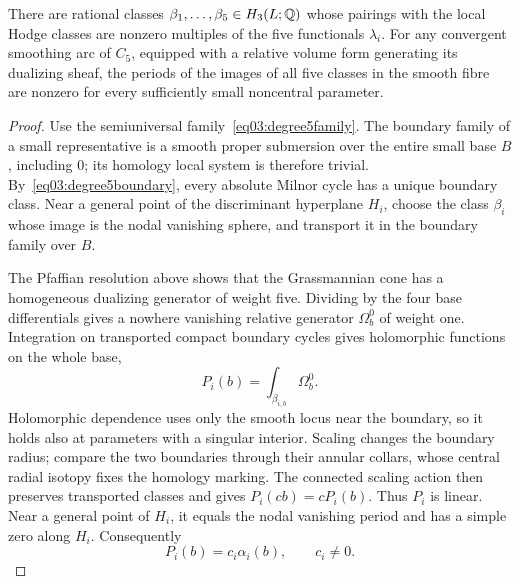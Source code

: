 \begin{lemma}\label{lem03:degree5periods}
There are rational classes $\beta_1,\ldots,\beta_5\in H_3(L;\mathbb{Q})$
whose pairings with the local Hodge classes are nonzero multiples
of the five functionals $\lambda_i$.
For any convergent smoothing arc of $C_5$, equipped with a relative
volume form generating its dualizing sheaf, the periods of the
images of all five classes in the smooth fibre are nonzero for
every sufficiently small noncentral parameter.
\end{lemma}

\begin{proof}
Use the semiuniversal family~\eqref{eq03:degree5family}.
The boundary family of a small representative is a smooth
proper submersion over the entire small base $B$, including $0$;
its homology local system is therefore trivial.
By~\eqref{eq03:degree5boundary}, every absolute Milnor cycle
has a unique boundary class.  Near a general point of the
discriminant hyperplane $H_i$, choose the class $\beta_i$
whose image is the nodal vanishing sphere, and transport it in
the boundary family over $B$.

The Pfaffian resolution above shows that the Grassmannian cone
has a homogeneous dualizing generator of weight five.  Dividing
by the four base differentials gives a nowhere vanishing
relative generator $\Omega_b^0$ of weight one.
Integration on transported compact boundary cycles gives
holomorphic functions on the whole base,
\[
 P_i(b)=\int_{\beta_{i,b}}\Omega_b^0.
\]
Holomorphic dependence uses only the smooth locus near the
boundary, so it holds also at parameters with a singular interior.
Scaling changes the boundary radius; compare the two boundaries
through their annular collars, whose central radial isotopy fixes
the homology marking.  The connected scaling action then preserves
transported classes and gives $P_i(cb)=cP_i(b)$.  Thus $P_i$ is linear.
Near a general point of $H_i$, it equals the nodal vanishing
period and has a simple zero along $H_i$.  Consequently
\begin{equation}\label{eq03:degree5linearperiod}
 P_i(b)=c_i\alpha_i(b),\qquad c_i\ne0.
\end{equation}


\end{proof}

